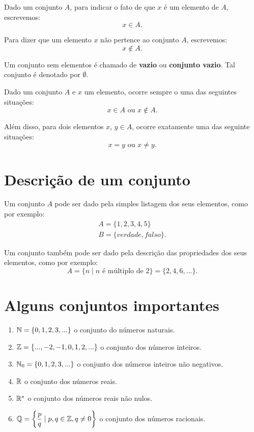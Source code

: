 Dado um conjunto $A$, para indicar o fato de que $x$ {\'e} um elemento de $A$, escrevemos:
\[
x \in A.
\]

Para dizer que um elemento $x$ n{\~a}o pertence ao conjunto $A$, escrevemos:
\[
x \notin A.
\]

Um conjunto sem elementos {\'e} chamado de \textbf{vazio} ou \textbf{conjunto vazio}. Tal conjunto {\'e} denotado por $\emptyset$.

Dado um conjunto $A$ e $x$ um elemento, ocorre sempre o uma das seguintes situa\c{c}\~oes:
\[
x \in A \mbox{ ou } x \notin A.
\]

Al{\'e}m disso, para dois elementos $x$, $y \in A$, ocorre exatamente uma das seguinte situa\c{c}\~oes:
\[
x = y \mbox{ ou } x \neq y.
\]

\section{Descri{\c c}{\~a}o de um conjunto}

Um conjunto $A$ pode ser dado pela simples listagem dos seus elementos, como por exemplo:
\begin{align*}
	A= \{1,2,3,4,5\}\\
	B = \{verdade, falso\}.
\end{align*}

Um conjunto tamb{\'e}m pode ser dado pela descri{\c c}{\~a}o das propriedades dos seus elementos, como por exemplo:
\[
A = \{n \mid n \mbox{ \'e m{\'u}ltiplo de } 2\} = \{2,4,6,...\}.
\]

\section{Alguns conjuntos importantes}
\begin{enumerate}
\item $\mathbb{N} = \{0,1,2,3,...\}$ o conjunto do n{\'u}meros naturais.
\item $\mathbb{Z} = \{...,-2,-1,0,1,2,...\}$ o conjunto dos n{\'u}meros inteiros.
\item $\mathbb{N}_0 = \{0,1,2,3,...\}$ o conjunto dos n{\'u}meros inteiros n{\~a}o negativos.
\item $\mathbb{R} $ o conjunto dos n{\'u}meros reais.
\item $\mathbb{R}^*$ o conjunto dos n{\'u}meros reais n{\~a}o nulos.
\item $\mathbb{Q} = \left\{\dfrac{p}{q} \mid p,q \in \mathbb{Z}, q \neq 0 \right\}$ o conjunto dos n{\'u}meros racionais.
\end{enumerate}

